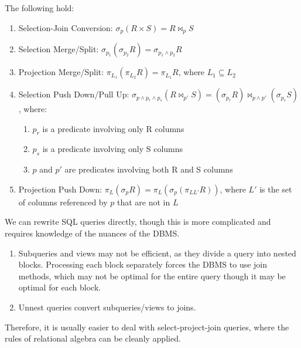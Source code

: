 \documentclass{article}
\begin{document}
      \begin{theorem}[Identities]
        The following hold:
        \begin{enumerate}
          \item Selection-Join Conversion: $\sigma_p(R \times S) = R \bowtie_p S$
          \item Selection Merge/Split: $\sigma_{p_1}(\sigma_{p_2}R) = \sigma_{p_1 \wedge p_2}R$
          \item Projection Merge/Split: $\pi_{L_1}(\pi_{L_2}R) = \pi_{L_1}R$, where $L_1 \subseteq L_2$
          \item Selection Push Down/Pull Up: $\sigma_{p \wedge p_r \wedge p_s}(R \bowtie_{p'} S) = (\sigma_{p_r}R) \bowtie_{p \wedge p'} (\sigma_{p_s}S)$, where:
            \begin{enumerate}
              \item $p_r$ is a predicate involving only R columns
              \item $p_s$ is a predicate involving only S columns
              \item $p$ and $p'$ are predicates involving both R and S columns
            \end{enumerate}
          \item Projection Push Down: $\pi_L(\sigma_p R) = \pi_L(\sigma_p(\pi_{L L'}R))$, where $L'$ is the set of columns referenced by $p$ that are not in $L$
        \end{enumerate}
      \end{theorem} 

      \begin{definition}
        We can rewrite SQL queries directly, though this is more complicated and requires knowledge of the nuances of the DBMS. 
        \begin{enumerate}
          \item Subqueries and views may not be efficient, as they divide a query into nested blocks. Processing each block separately forces the DBMS to use join methods, which may not be optimal for the entire query though it may be optimal for each block. 
          \item Unnest queries convert subqueries/views to joins. 
        \end{enumerate}
        Therefore, it is usually easier to deal with select-project-join queries, where the rules of relational algebra can be cleanly applied. 
      \end{definition} 
\end{document}
